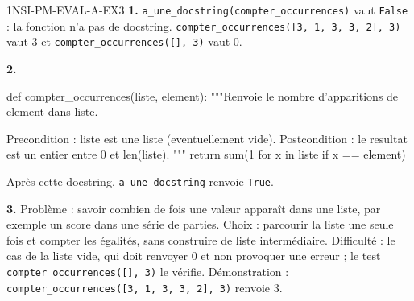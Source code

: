 \begin{corrige}{1NSI-PM-EVAL-A-EX3}
\textbf{1.} \lstinline{a_une_docstring(compter_occurrences)} vaut \lstinline{False} : la
fonction n'a pas de docstring. \lstinline{compter_occurrences([3, 1, 3, 3, 2], 3)} vaut $3$
et \lstinline{compter_occurrences([], 3)} vaut $0$.

\textbf{2.}
\begin{python}
def compter_occurrences(liste, element):
    """Renvoie le nombre d'apparitions de element dans liste.

    Precondition : liste est une liste (eventuellement vide).
    Postcondition : le resultat est un entier entre 0 et len(liste).
    """
    return sum(1 for x in liste if x == element)
\end{python}
Après cette docstring, \lstinline{a_une_docstring} renvoie \lstinline{True}.

\textbf{3.} Problème : savoir combien de fois une valeur apparaît dans une liste, par
exemple un score dans une série de parties. Choix : parcourir la liste une seule fois et
compter les égalités, sans construire de liste intermédiaire. Difficulté : le cas de la liste
vide, qui doit renvoyer $0$ et non provoquer une erreur ; le test
\lstinline{compter_occurrences([], 3)} le vérifie. Démonstration :
\lstinline{compter_occurrences([3, 1, 3, 3, 2], 3)} renvoie $3$.
\end{corrige}
